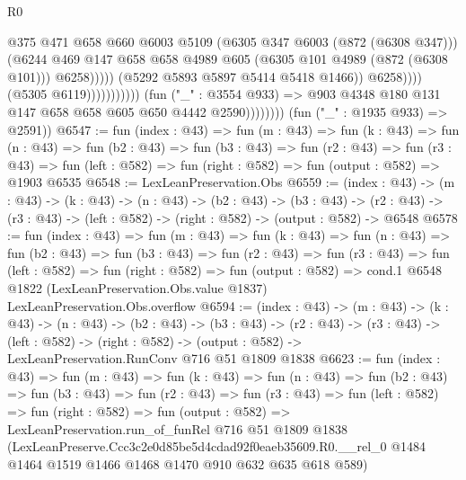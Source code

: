 \begin{lexlean}{R0}
\begin{coremodule}
                                                          @375
                                                          @471
                                                          @658
                                                          @660
                                                          @6003
                                                          @5109
                                                          (@6305 @347 @6003 (@872 (@6308 @347)))
                                                          (@6244
                                                            @469
                                                            @147
                                                            @658
                                                            @658
                                                            @4989
                                                            @605
                                                            (@6305 @101 @4989 (@872 (@6308 @101)))
                                                            @6258)))))
                                                  (@5292 @5893 @5897 @5414 @5418 @1466))
                                                @6258))))
                                        (@5305 @6119)))))))))))
                    (fun ("_" : @3554 @933) =>
                    @903 @4348 @180 @131 @147 @658 @658 @605 @650 @4442 @2590))))))))
      (fun ("_" : @1935 @933) => @2591))
@6547 := fun (index : @43) =>
  fun (m : @43) =>
  fun (k : @43) =>
  fun (n : @43) =>
  fun (b2 : @43) =>
  fun (b3 : @43) =>
  fun (r2 : @43) =>
  fun (r3 : @43) => fun (left : @582) => fun (right : @582) => fun (output : @582) => @1903 @6535
@6548 := LexLeanPreservation.Obs
@6559 := (index : @43) ->
  (m : @43) ->
  (k : @43) ->
  (n : @43) ->
  (b2 : @43) ->
  (b3 : @43) ->
  (r2 : @43) -> (r3 : @43) -> (left : @582) -> (right : @582) -> (output : @582) -> @6548
@6578 := fun (index : @43) =>
  fun (m : @43) =>
  fun (k : @43) =>
  fun (n : @43) =>
  fun (b2 : @43) =>
  fun (b3 : @43) =>
  fun (r2 : @43) =>
  fun (r3 : @43) =>
  fun (left : @582) =>
  fun (right : @582) =>
  fun (output : @582) =>
  cond.{1} @6548 @1822 (LexLeanPreservation.Obs.value @1837) LexLeanPreservation.Obs.overflow
@6594 := (index : @43) ->
  (m : @43) ->
  (k : @43) ->
  (n : @43) ->
  (b2 : @43) ->
  (b3 : @43) ->
  (r2 : @43) ->
  (r3 : @43) ->
  (left : @582) ->
  (right : @582) -> (output : @582) -> LexLeanPreservation.RunConv @716 @51 @1809 @1838
@6623 := fun (index : @43) =>
  fun (m : @43) =>
  fun (k : @43) =>
  fun (n : @43) =>
  fun (b2 : @43) =>
  fun (b3 : @43) =>
  fun (r2 : @43) =>
  fun (r3 : @43) =>
  fun (left : @582) =>
  fun (right : @582) =>
  fun (output : @582) =>
  LexLeanPreservation.run_of_funRel
    @716
    @51
    @1809
    @1838
    (LexLeanPreserve.Ccc3c2e0d85be5d4cdad92f0eaeb35609.R0.__rel_0
      @1484
      @1464
      @1519
      @1466
      @1468
      @1470
      @910
      @632
      @635
      @618
      @589)
\end{coremodule}
\end{lexlean}
